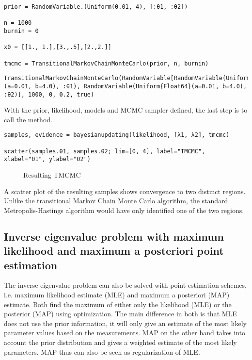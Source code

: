 \begin{verbatim}
prior = RandomVariable.(Uniform(0.01, 4), [:θ1, :θ2])

n = 1000
burnin = 0

x0 = [[1., 1.],[3.,.5],[2.,2.]]

tmcmc = TransitionalMarkovChainMonteCarlo(prior, n, burnin)
\end{verbatim}


\begin{verbatim}
TransitionalMarkovChainMonteCarlo(RandomVariable[RandomVariable(Uniform{Float64}(a=0.01, b=4.0), :θ1), RandomVariable(Uniform{Float64}(a=0.01, b=4.0), :θ2)], 1000, 0, 0.2, true)
\end{verbatim}



With the prior, likelihood, models and  MCMC sampler defined, the last step is to call the  method.




\begin{verbatim}
samples, evidence = bayesianupdating(likelihood, [λ1, λ2], tmcmc)

scatter(samples.θ1, samples.θ2; lim=[0, 4], label="TMCMC", xlabel="θ1", ylabel="θ2")
\end{verbatim}



\begin{figure}
\centering
{}
\caption{Resulting TMCMC}
\end{figure}
  A scatter plot of the resulting samples shows convergence to two distinct regions. Unlike the transitional Markov Chain Monte Carlo algorithm, the standard Metropolis-Hastings algorithm would have only identified one of the two regions.



\subsection{Inverse eigenvalue problem with maximum likelihood and maximum a posteriori point estimation}



\label{6789376627140577471}{}


The inverse eigenvalue problem can also be solved with point estimation schemes, i.e. maximum likelihood estimate (MLE) and maximum a posteriori (MAP) estimate. Both find the maximum of either only the likelihood (MLE) or the posterior (MAP) using optimization. The main difference in both is that MLE does not use the prior information, it will only give an estimate of the most likely parameter values based on the measurements. MAP on the other hand takes into account the prior distribution and gives a weighted estimate of the most likely parameters. MAP thus can also be seen as regularization of MLE.



